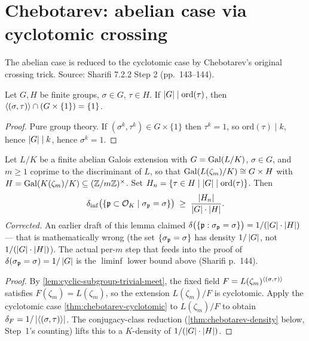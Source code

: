 \section{Chebotarev: abelian case via cyclotomic crossing}

The abelian case is reduced to the cyclotomic case by Chebotarev's
original crossing trick. Source: Sharifi 7.2.2 Step 2 (pp.~143--144).

\begin{lemma}\label{lem:cyclic-subgroup-trivial-meet}
  \leanok
  Let $G, H$ be finite groups, $\sigma \in G$, $\tau \in H$. If
  $\left\lvert G \right\rvert\mid\mathrm{ord}(\tau)$, then
  $\left\langle (\sigma,\tau) \right\rangle\cap (G\times\{1\}) = \{1\}$.
\end{lemma}

\begin{proof}
  \leanok
  Pure group theory. If $(\sigma^k, \tau^k) \in G\times\{1\}$ then
  $\tau^k = 1$, so $\mathrm{ord}(\tau)\mid k$, hence
  $\left\lvert G \right\rvert\mid k$, hence $\sigma^k = 1$.
\end{proof}

\begin{lemma}\label{lem:density-S-sigma-tau}
  Let $L/K$ be a finite abelian Galois extension with $G=\mathrm{Gal}(L/K)$,
  $\sigma\in G$, and $m\ge 1$ coprime to the discriminant of $L$, so
  that $\mathrm{Gal}(L(\zeta_m)/K)\cong G\times H$ with
  $H=\mathrm{Gal}(K(\zeta_m)/K)\subseteq(\mathbb{Z}/m\mathbb{Z})^\times$. Set
  $H_n = \left\{ \tau\in H \;\middle|\; \left\lvert G \right\rvert\mid\mathrm{ord}(\tau) \right\}$. Then
  \[
    \delta_{\mathrm{inf}}\bigl(\left\{ \mathfrak{p}\subset\mathcal{O}_K \;\middle|\; 
      \sigma_{\mathfrak{p}} = \sigma \right\}\bigr)
    \;\ge\; \frac{\left\lvert H_n \right\rvert}{\left\lvert G \right\rvert\cdot\left\lvert H \right\rvert}.
  \]
  \emph{Corrected.} An earlier draft of this lemma claimed
  $\delta\bigl(\left\{ \mathfrak{p} : \sigma_{\mathfrak{p}} = \sigma \right\}\bigr) = 1/(\left\lvert G \right\rvert\cdot\left\lvert H \right\rvert)$
  — that is mathematically wrong (the set $\left\{ \sigma_{\mathfrak{p}} = \sigma \right\}$
  has density $1/\left\lvert G \right\rvert$, not $1/(\left\lvert G \right\rvert\cdot\left\lvert H \right\rvert)$). The actual
  per-$m$ step that feeds into the proof of $\delta(\sigma_{\mathfrak{p}} = \sigma)
  = 1/\left\lvert G \right\rvert$ is the $\liminf$ lower bound above (Sharifi p.~144).
\end{lemma}

\begin{proof}
  By \cref{lem:cyclic-subgroup-trivial-meet}, the fixed field
  $F = L(\zeta_m)^{\left\langle (\sigma,\tau) \right\rangle}$ satisfies
  $F(\zeta_m) = L(\zeta_m)$, so the extension $L(\zeta_m)/F$ is
  cyclotomic. Apply the cyclotomic case
  \cref{thm:chebotarev-cyclotomic} to $L(\zeta_m)/F$ to obtain
  $\delta_F = 1/\left\lvert \left\langle (\sigma,\tau) \right\rangle \right\rvert$. The conjugacy-class
  reduction (\cref{thm:chebotarev-density} below, Step~1's counting)
  lifts this to a $K$-density of $1/(\left\lvert G \right\rvert\cdot\left\lvert H \right\rvert)$.
\end{proof}

